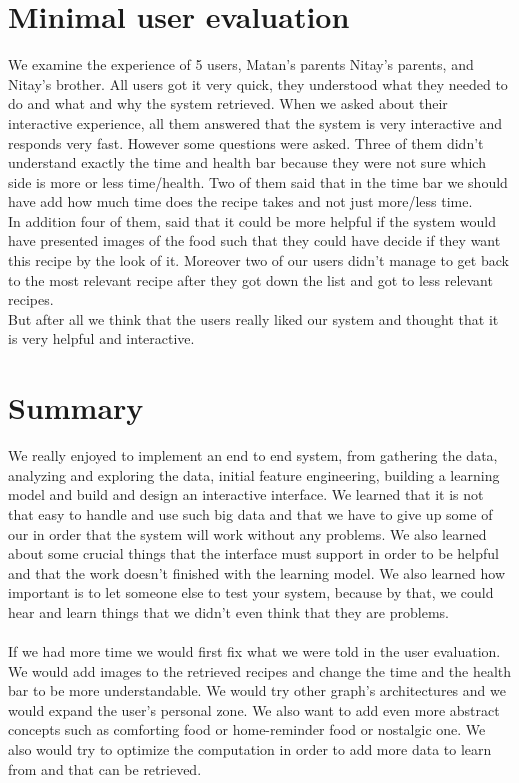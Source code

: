 \documentclass[]{article}
\begin{document}
\section{Minimal user evaluation}
We examine the experience of 5 users, Matan's parents Nitay's parents, and Nitay's brother.
All users got it very quick, they understood what they needed to do and what and why the system retrieved. When we asked about their interactive experience, all them answered that the system is very interactive and responds very fast. However some questions were asked. Three of them didn't understand exactly the time and health bar because they were not sure which side is more or less time/health. Two of them said that in the time bar we should have add how much time does the recipe takes and not just more/less time.\\
In addition four of them, said that it could be more helpful if the system would have presented images of the food such that they could have decide if they want this recipe by the look of it.
Moreover two of our users didn't manage to get back to the most relevant recipe after they got down the list and got to less relevant recipes. \\
But after all we think that the users really liked our system and thought that it is very helpful and interactive.
\pagebreak
\section{Summary}
We really enjoyed to implement an end to end system, from gathering the data, analyzing and exploring the data, initial feature engineering, building a learning model and build and design an interactive interface. We learned that it is not that easy to handle and use such big data and that we have to give up some of our in order that the system will work without any problems.
We also learned about some crucial things that the interface must support in order to be helpful and that the work doesn't finished with the learning model. We also learned how important is to let someone else to test your system, because by that, we could hear and learn things that we didn't even think that they are problems.\\\\
If we had more time we would first fix what we were told in the user evaluation. We would add images to the retrieved recipes and change the time and the health bar to be more understandable.
We would try other graph's architectures and we would expand the user's personal zone.
We also want to add even more abstract concepts such as comforting food or home-reminder food or nostalgic one. We also would try to optimize the computation in order to add more data to learn from and that can be retrieved.



\pagebreak


\end{document}
